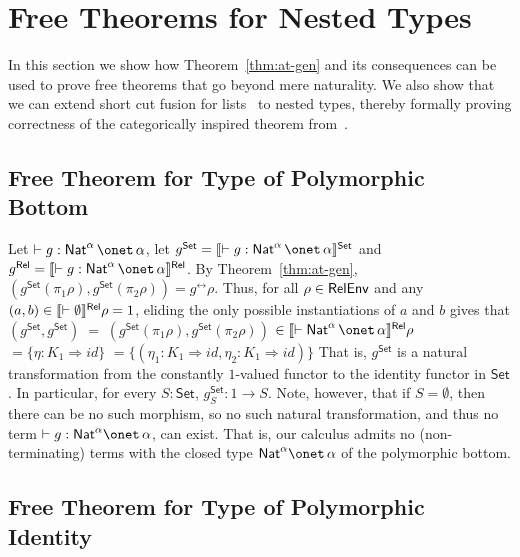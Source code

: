 \documentclass{lmcs}
\theoremstyle{plain}\newtheorem{satz}[thm]{Satz}
\newcommand{\set}{\mathsf{Set}}
\renewcommand{\id}{\mathit{id}}
\begin{document}
{\section{Free Theorems for Nested Types}\label{sec:ftnt}

In this section we show how Theorem~\ref{thm:at-gen} and its
consequences can be used to prove free theorems that go beyond mere
naturality.  We also show that we can extend short cut fusion for
lists~\cite{glp93} to nested types, thereby formally proving
correctness of the categorically inspired theorem from~\cite{jg10}.

\subsection{Free Theorem for Type of Polymorphic
  Bottom}\label{sec:bottom} 

Let $ \vdash g : \Nat^\alpha \,\onet\,\alpha$, let $g^\set =
\setsem{\vdash g : \Nat^\alpha \,\onet\,\alpha}$ and $g^\rel =
\relsem{\vdash g : \Nat^\alpha \,\onet\,\alpha}$.  By
Theorem~\ref{thm:at-gen}, $(g^\set(\pi_1\rho),g^\set(\pi_2\rho)) =
g^\rel\rho$. Thus, for all $\rho \in \mathsf{RelEnv}$ and any $(a, b) \in
\llbracket{\vdash \emptyset}\rrbracket^{\mathsf{Rel}}\rho = 1$, eliding the only possible
instantiations of $a$ and $b$ gives that $(g^\set,g^\set) \;= \;
(g^\set(\pi_1 \rho), g^\set (\pi_2 \rho))$ $ \in \relsem{\vdash
  \Nat^\alpha \,\onet\,\alpha}\rho$ $ = \{\eta : K_1 \Rightarrow
\id\}$ $ = \{(\eta_1 : K_1 \Rightarrow \id, \eta_2 : K_1 \Rightarrow
\id)\}$ That is, $g^\set$ is a natural transformation from the
constantly $1$-valued functor to the identity functor in $\set$. In
particular, for every $S : \set$, $g^\set_S : 1 \to S$. Note, however,
that if $S = \emptyset$, then there can be no such morphism, so no
such natural transformation, and thus no term $\vdash g : \Nat^\alpha
\onet \,\alpha$, can exist.  That is, our calculus admits no
(non-terminating) terms with the closed type $\Nat^\alpha \onet
\,\alpha$ of the polymorphic bottom.

\subsection{Free Theorem for Type of Polymorphic
  Identity}\label{sec:identity} 

}
\end{document}
